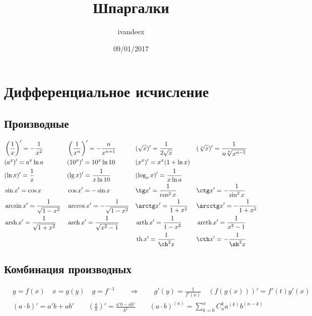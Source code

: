 \documentclass[a4paper,11pt]{article}
\author{ivandeex}
\title{Шпаргалки}
\date{09/01/2017}
\DeclareMathOperator{\thh}{\mathop{th}}
\DeclareMathOperator{\arsh}{\mathop{arsh}}
\DeclareMathOperator{\arch}{\mathop{arch}}
\DeclareMathOperator{\arth}{\mathop{arth}}
\DeclareMathOperator{\arcth}{\mathop{arcth}}
\begin{document}
	


\section{Дифференциальное исчисление}


\subsection{Производные}

\begin{mdframed}[innertopmargin=-.6\baselineskip,linewidth=.8pt]
\begin{align*}
 &  \left( \frac 1 x \right)' = - \frac 1 {x^2}
 && \left( \frac 1 {x^n} \right)' = - \frac n {x^{n+1}}
 && ( \sqrt{x} )' = \frac 1 {2\sqrt{x}}
 && ( \sqrt[n] x )' = \frac 1 {n \sqrt[n]{x^{n-1}}}
\\& (a^x)' = a^x \ln a
 && (10^x)' = 10^x \ln 10
 && (x^x)' = x^x (1+\ln x)
 &&
\\& (\ln x)' = \frac 1 x
 && (\lg x)' = \frac 1 {x \ln 10}
 && ( \log_{a}x  )' = \frac 1 {x \ln a}
 &&
\\& \sin x' = \cos x
 && \cos x' = - \sin x
 && \tg x' = \frac 1 {\cos^2 x}
 && \ctg x' = - \frac 1 {\sin^2 x}
\\& \arcsin x' = \frac 1 {\sqrt{1-x^2}}
 && \arccos x' = - \frac 1 {\sqrt{1-x^2}}
 && \arctg x' = \frac 1 {1+x^2}
 && \arcctg x' = - \frac 1 {1+x^2}
\\& \arsh x' = \frac 1 {\sqrt{1+x^2}}
 && \arch x' = \frac 1 {\sqrt{x^2-1}}
 && \arth x' = \frac 1 {1-x^2}
 && \arcth x' = \frac 1 {x^2-1}
\\& 
 && 
 && \thh x' = \frac 1 {\ch^2 x}
 && \cth x' = - \frac 1 {\sh^2 x}
\end{align*}
\end{mdframed}


\subsection{Комбинация производных}

\begin{mdframed}[innertopmargin=-.6\baselineskip,linewidth=.8pt]
\begin{align*}
&  y = f(x) \quad x = g(y) \quad g = f^{-1}
  \qquad \Rightarrow \qquad
  g'(y) = \frac 1 {f'(x)} \quad
  \left( f(g(x)) \right)' = f'(t) g'(x)
\\&     (a \cdot b)' = a'b + ab'
\qquad \left( \frac a b \right)' = \frac{a'b-ab'}{b^2}
\qquad (a \cdot b)^{(n)} = \sum_{k=0}^n{C_n^k a^{(k)} b^{(n-k)}}
\end{align*}
\end{mdframed}
\end{document}
